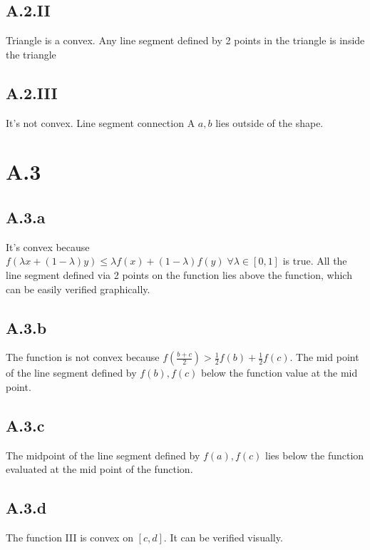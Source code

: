 \documentclass[]{article}
\begin{document}
    \subsection*{A.2.II}
        Triangle is a convex. Any line segment defined by 2 points in the triangle is inside the triangle
    \subsection*{A.2.III}
        It's not convex. Line segment connection A $a, b$ lies outside of the shape. 

\section*{A.3}
    \subsection*{A.3.a}    
        It's convex because $f(\lambda x + (1 - \lambda)y)\le \lambda f(x) + (1 - \lambda)f(y) \;\forall \lambda\in [0, 1]$ is true. All the line segment defined via 2 points on the function lies above the function, which can be easily verified graphically. 
    \subsection*{A.3.b}
        The function is not convex because $f(\frac{b + c}{2}) > \frac{1}{2}f(b) + \frac{1}{2}f(c)$. The mid point of the line segment defined by $f(b), f(c)$ below the function value at the mid point. 
    \subsection*{A.3.c}
        The midpoint of the line segment defined by $f(a), f(c)$ lies below the function evaluated at the mid point of the function. 
    \subsection*{A.3.d}
        The function III is convex on $[c,d]$. It can be verified visually. 
\end{document}
